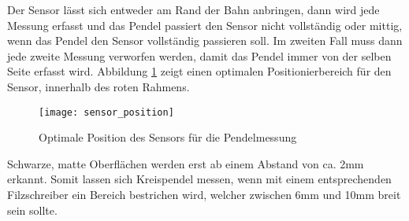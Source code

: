 Der Sensor lässt sich entweder am Rand der Bahn anbringen, dann wird jede Messung erfasst und das Pendel passiert den Sensor nicht vollständig oder mittig, wenn das Pendel den Sensor vollständig passieren soll. Im zweiten Fall muss dann jede zweite Messung verworfen werden, damit das Pendel immer von der selben Seite erfasst wird. Abbildung \ref{fig:sensor_position} zeigt einen optimalen Positionierbereich für den Sensor, innerhalb des roten Rahmens.
	\begin{figure}[H]
		\centering
		\texttt{[image: sensor\_position]}
		\caption{Optimale Position des Sensors für die Pendelmessung}
		\label{fig:sensor_position}
	\end{figure}
	\noindent Schwarze, matte Oberflächen werden erst ab einem Abstand von ca. 2mm erkannt. Somit lassen sich Kreispendel messen, wenn mit einem entsprechenden Filzschreiber ein Bereich bestrichen wird, welcher zwischen 6mm und 10mm breit sein sollte.